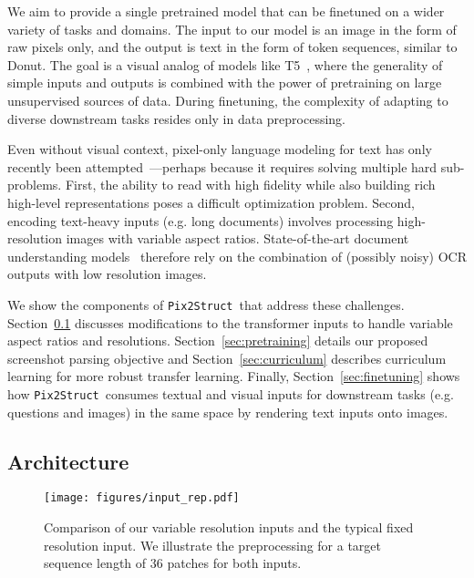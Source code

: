 \documentclass{article} \usepackage[accepted]{icml2023}
\newcommand\ourmodel{{\texttt{Pix2Struct}}}
\begin{document}
We aim to provide a single pretrained model that can be finetuned on a wider variety of tasks and domains. The input to our model is an image in the form of raw pixels only, and the output is text in the form of token sequences, similar to Donut. The goal is a visual analog of models like T5~\citep{t5}, where the generality of simple inputs and outputs is combined with the power of pretraining on large unsupervised sources of data. During finetuning, the complexity of adapting to diverse downstream tasks resides only in data preprocessing.

Even without visual context, pixel-only language modeling for text has only recently been attempted~\citep{rust2022language}---perhaps because it requires solving multiple hard sub-problems. First, the ability to read with high fidelity while also building rich high-level representations poses a difficult optimization problem. Second, encoding text-heavy inputs (e.g. long documents) involves processing high-resolution images with variable aspect ratios. State-of-the-art document understanding models~\citep{layoutlmv3} therefore rely on the combination of (possibly noisy) OCR outputs with low resolution images. 

We show the components of \ourmodel~that address these challenges. Section~\ref{sec:architecture} discusses modifications to the transformer inputs to handle variable aspect ratios and resolutions. Section~\ref{sec:pretraining} details our proposed screenshot parsing objective and Section~\ref{sec:curriculum} describes curriculum learning for  more robust transfer learning. Finally, Section~\ref{sec:finetuning} shows how \ourmodel~consumes textual and visual inputs for downstream tasks (e.g. questions and images) in the same space by rendering text inputs onto images. 

\subsection{Architecture}
\label{sec:architecture}

\begin{figure*}[ht]
\begin{center}
\texttt{[image: figures/input\_rep.pdf]}
\end{center}
\caption{Comparison of our variable resolution inputs and the typical fixed resolution input. We illustrate the preprocessing for a target sequence length of 36 patches for both inputs.}
\label{fig:input_rep}
\end{figure*}
\end{document}

